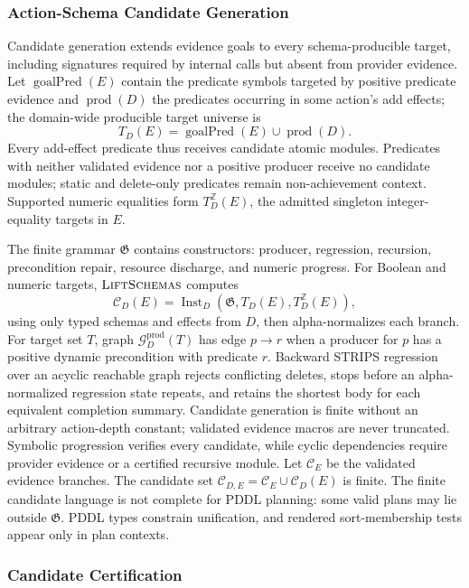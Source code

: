 \subsubsection{Action-Schema Candidate Generation}

Candidate generation extends evidence goals to every schema-producible target,
including signatures required by internal calls but absent from provider
evidence.
Let $\operatorname{goalPred}(E)$ contain the predicate symbols targeted by
positive predicate evidence and $\operatorname{prod}(D)$ the predicates
occurring in some action's add effects; the domain-wide producible target
universe is
\[
T_D(E)=\operatorname{goalPred}(E)\cup\operatorname{prod}(D).
\]
Every add-effect predicate thus receives candidate atomic modules. Predicates
with neither validated evidence nor a positive producer receive no candidate
modules; static and
delete-only predicates remain non-achievement context. Supported numeric
equalities form $T_D^{\mathbb Z}(E)$, the admitted singleton integer-equality
targets in $E$.

The finite grammar $\mathfrak G$ contains constructors: producer,
regression, recursion, precondition repair, resource discharge, and numeric
progress. For Boolean and numeric targets, $\textsc{LiftSchemas}$ computes
\[
\mathcal C_D(E)=
\operatorname{Inst}_D(\mathfrak G,T_D(E),T_D^{\mathbb Z}(E)),
\]
using only typed schemas and effects from $D$, then alpha-normalizes each
branch.
For target set $T$, graph $\mathcal G_D^{\mathrm{prod}}(T)$ has edge
$p\rightarrow r$ when a producer
for $p$ has a positive dynamic precondition with predicate $r$.
Backward STRIPS regression
\cite{Fikes1972GeneralizedRobotPlans,Alcazar2013Regression,Chen2026Moose}
over an acyclic reachable graph rejects conflicting deletes, stops
before an alpha-normalized regression state repeats, and retains the shortest
body for each equivalent completion summary. Candidate generation is finite
without an arbitrary action-depth constant; validated
evidence macros are never truncated. Symbolic progression verifies every
candidate, while cyclic dependencies require provider evidence or a
certified recursive module. Let $\mathcal C_E$ be the validated evidence
branches. The candidate set
$\mathcal C_{D,E}=\mathcal C_E\cup\mathcal C_D(E)$ is finite. The finite
candidate language is not complete for PDDL planning: some valid plans may lie
outside $\mathfrak G$. PDDL types constrain unification, and rendered
sort-membership tests appear only in plan contexts.

\subsubsection{Candidate Certification}

